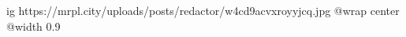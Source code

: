 
 
 
 
 

\ifcmt
  ig https://mrpl.city/uploads/posts/redactor/w4cd9acvxroyyjcq.jpg
  @wrap center
  @width 0.9
\fi
